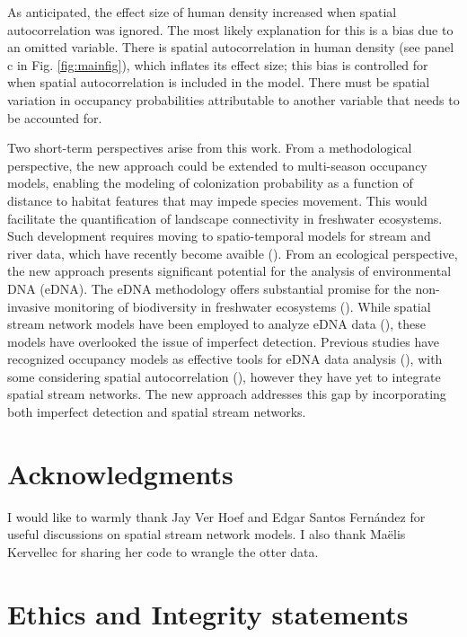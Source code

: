 \documentclass[
  11pt,
  a4paper,
]{article}
\begin{document}
As anticipated, the effect size of human density increased when spatial autocorrelation was ignored. The most likely explanation for this is a bias due to an omitted variable. There is spatial autocorrelation in human density (see panel c in Fig. \ref{fig:mainfig}), which inflates its effect size; this bias is controlled for when spatial autocorrelation is included in the model. There must be spatial variation in occupancy probabilities attributable to another variable that needs to be accounted for.

Two short-term perspectives arise from this work. From a methodological perspective, the new approach could be extended to multi-season occupancy models, enabling the modeling of colonization probability as a function of distance to habitat features that may impede species movement. This would facilitate the quantification of landscape connectivity in freshwater ecosystems. Such development requires moving to spatio-temporal models for stream and river data, which have recently become avaible (). From an ecological perspective, the new approach presents significant potential for the analysis of environmental DNA (eDNA). The eDNA methodology offers substantial promise for the non-invasive monitoring of biodiversity in freshwater ecosystems (). While spatial stream network models have been employed to analyze eDNA data (), these models have overlooked the issue of imperfect detection. Previous studies have recognized occupancy models as effective tools for eDNA data analysis (), with some considering spatial autocorrelation (), however they have yet to integrate spatial stream networks. The new approach addresses this gap by incorporating both imperfect detection and spatial stream networks.

\section{Acknowledgments}\label{acknowledgments}

I would like to warmly thank Jay Ver Hoef and Edgar Santos Fernández for useful discussions on spatial stream network models. I also thank Maëlis Kervellec for sharing her code to wrangle the otter data.

\section{Ethics and Integrity statements}\label{ethics-and-integrity-statements}
\end{document}
